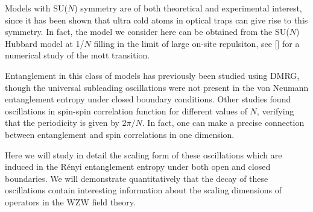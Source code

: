 \documentclass[aps,prb,reprint,floatfix]{revtex4-1}
\begin{document}
 
Models with SU($N$) symmetry are of both theoretical and experimental interest, since it has been shown that ultra cold atoms in optical traps can give rise to this symmetry.\cite{Gorshkov2010:TwoOrbitalSUN}  In fact, the model we consider here can be obtained from the SU($N$) Hubbard model at 1/$N$ filling in the limit of large on-site repulsiton, see [] for a numerical study of the mott transition.

Entanglement in this class of models has previously been studied using DMRG,\cite{Fuhringer2008:DMRGSUN} though the universal subleading oscillations were not present in the von Neumann entanglement entropy under closed boundary conditions.  Other studies\cite{Frischmuth1999:ThermoSU4,Messio2012:entropyDep} found oscillations in spin-spin correlation function for different values of $N$, verifying that the periodicity is given by 2$\pi/N$.  In fact, one can make a precise connection between entanglement and spin correlations in one dimension.\cite{Song2010:EntanglementFluctuations}

Here we will study in detail the scaling form of these oscillations which are induced in the R\'{e}nyi entanglement entropy under both open and closed boundaries. We will demonstrate quantitatively that the decay of these oscillations contain interesting information about the scaling dimensions of operators in the WZW field theory.
\end{document}
